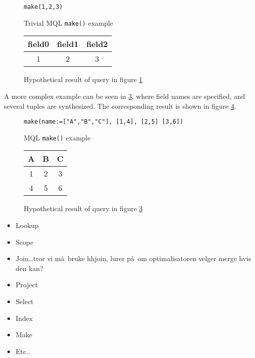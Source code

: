\begin{figure}[!h]
\centering
\begin{Verbatim}
make(1,2,3)
\end{Verbatim}
\caption{Trivial MQL \texttt{make()} example}
\label{figure:mql:make_example1}
\end{figure}

\begin{figure}[!h]
\centering
\begin{tabular}{|c | c | c |}
\hline
field0 & field1 & field2 \\ \hline
1 & 2 & 3 \\ \hline
\end{tabular}
\caption{Hypothetical result of query in figure
\ref{figure:mql:make_example1}}
\label{figure:mql:make_example1_result}
\end{figure}

A more complex example can be seen in \ref{figure:mql:make_example2}, where
field names are specified, and several tuples are synthesized. The
corresponding result is shown in figure \ref{figure:mql:make_example2_result}.

\begin{figure}[!h]
\centering
\begin{Verbatim}
make(name:=["A","B","C"], [1,4], [2,5] [3,6])
\end{Verbatim}
\caption{MQL \texttt{make()} example}
\label{figure:mql:make_example2}
\end{figure}

\begin{figure}[!h]
\centering
\begin{tabular}{|c | c | c |}
\hline
A & B & C \\ \hline
1 & 2 & 3 \\ \hline
4 & 5 & 6 \\ \hline
\end{tabular}
\caption{Hypothetical result of query in figure
\ref{figure:mql:make_example2}}
\label{figure:mql:make_example2_result}
\end{figure}


\begin{itemize}
  \item Lookup
  \item Scope
  \item Join\ldots tror vi m\aa~bruke hhjoin, lurer p\aa~om optimalisatoren velger merge hvis den kan?
  \item Project
  \item Select
  \item Index
  \item Make
  \item Etc..
\end{itemize}

